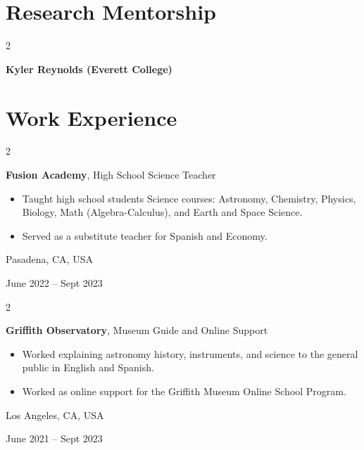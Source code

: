 \documentclass[10pt, letterpaper]{article}
\newenvironment{highlights}{
    \begin{itemize}[
        topsep=0.10 cm,
        parsep=0.10 cm,
        partopsep=0pt,
        itemsep=0pt,
        leftmargin=0.4 cm + 10pt
    ]
}{
    \end{itemize}
} %
\newenvironment{twocolentry}[2][]{
    \onecolentry
    \def\secondColumn{#2}
    \setcolumnwidth{\fill, 4.5 cm}
    \begin{paracol}{2}
}{
    \switchcolumn \raggedleft \secondColumn
    \end{paracol}
    \endonecolentry
} %
\begin{document}
    
    \section{Research Mentorship}



        
        \begin{twocolentry}{
            2024
        }
            \textbf{Kyler Reynolds (Everett College)}
        \end{twocolentry}



    
    \section{Work Experience}



        
        \begin{twocolentry}{
            Pasadena, CA, USA

        June 2022 – Sept 2023
        }
            \textbf{Fusion Academy}, High School Science Teacher
            \begin{highlights}
                \item Taught high school students Science courses: Astronomy, Chemistry, Physics, Biology, Math (Algebra-Calculus), and Earth and Space Science.
                \item Served as a substitute teacher for Spanish and Economy.
            \end{highlights}
        \end{twocolentry}


        \vspace{0.2 cm}

        \begin{twocolentry}{
            Los Angeles, CA, USA

        June 2021 – Sept 2023
        }
            \textbf{Griffith Observatory}, Museum Guide and Online Support
            \begin{highlights}
                \item Worked explaining astronomy history, instruments, and science to the general public in English and Spanish.
                \item Worked as online support for the Griffith Museum Online School Program.
            \end{highlights}
        \end{twocolentry}
\end{document}

